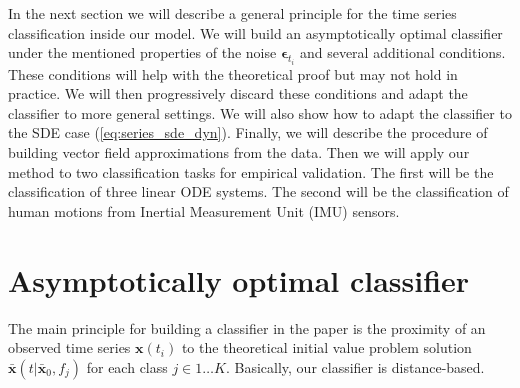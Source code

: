 \documentclass[referee, pdflatex, sn-mathphys-num]{sn-jnl}
\theoremstyle{definition}
\theoremstyle{plain}
\newcommand{\bx}{\ensuremath{\mathbf{x}}}
\newcommand{\bbx}{\ensuremath{\bar{\mathbf{x}}}}
\newcommand{\beps}{\ensuremath{\boldsymbol{\epsilon}}}
\begin{document}
	In the next section we will describe a general principle for the time series classification inside our model. We will build an asymptotically optimal classifier under the mentioned properties of the noise $\beps_{t_i}$ and several additional conditions. These conditions will help with the theoretical proof but may not hold in practice. We will then progressively discard these conditions and adapt the classifier to more general settings. We will also show how to adapt the classifier to the SDE case (\ref{eq:series_sde_dyn}). Finally, we will describe the procedure of building vector field approximations from the data. Then we will apply our method to two classification tasks for empirical validation. The first will be the classification of three linear ODE systems. The second will be the classification of human motions from Inertial Measurement Unit (IMU) sensors.
	
	\section{Asymptotically optimal classifier}
	
	The main principle for building a classifier in the paper is the proximity of an observed time series $\bx(t_i)$ to the theoretical initial value problem solution $\bbx(t | \bbx_0, f_j)$ for each class $j \in 1 \ldots K$. Basically, our classifier is distance-based.
	
\end{document}
